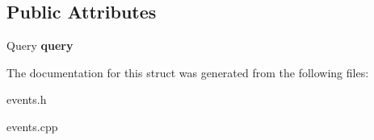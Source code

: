 \subsection*{Public Attributes}
\begin{DoxyCompactItemize}
\item 
Query {\bfseries query}\hypertarget{struct_query_event___abfce144c810ec391ade61dfeebefa3a8}{}\label{struct_query_event___abfce144c810ec391ade61dfeebefa3a8}

\end{DoxyCompactItemize}


The documentation for this struct was generated from the following files\+:\begin{DoxyCompactItemize}
\item 
events.\+h\item 
events.\+cpp\end{DoxyCompactItemize}
